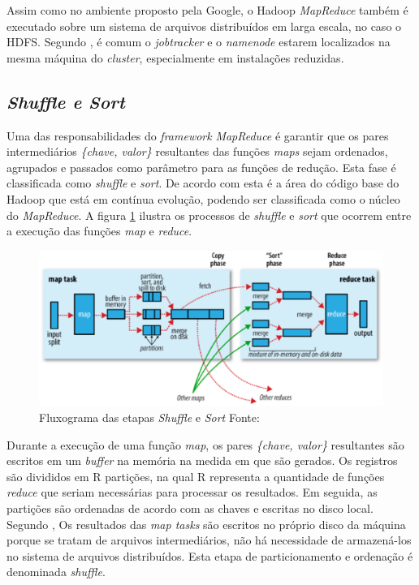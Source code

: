 Assim como no ambiente proposto pela Google, o Hadoop \textit{MapReduce} também é executado sobre um sistema de arquivos distribuídos em larga escala, no caso o HDFS. Segundo , é comum o \textit{jobtracker} e o \textit{namenode} estarem localizados na mesma máquina do \textit{cluster}, especialmente em instalações reduzidas.

\subsection{\textit{Shuffle e Sort}}

Uma das responsabilidades do \textit{framework} \textit{MapReduce} é garantir que os pares intermediários \textit{\{chave, valor\}} resultantes das funções \textit{maps} sejam ordenados, agrupados e passados como parâmetro para as funções de redução. Esta fase é classificada como \textit{shuffle} e \textit{sort}. De acordo com  esta é a área do código base do Hadoop que está em contínua evolução, podendo ser classificada como o núcleo do \textit{MapReduce}. A figura \ref{fig-shuffle} ilustra os processos de \textit{shuffle} e \textit{sort} que ocorrem entre a execução das funções \textit{map} e \textit{reduce}.

\begin{figure}[ht!]
	\centering
	\includegraphics[keepaspectratio=true,scale=0.6]
	  {figuras/shuffle.eps}
	\caption[Fluxograma das etapas \textit{Shuffle} e \textit{Sort}]{Fluxograma das etapas \textit{Shuffle} e \textit{Sort}
	\protect\linebreak Fonte: \cite{white2012}}
	\label{fig-shuffle}
\end{figure}
\FloatBarrier

Durante a execução de uma função \textit{map}, os pares \textit{\{chave, valor\}} resultantes são escritos em um \textit{buffer} na memória na medida em que são gerados. Os registros são divididos em R partições, na qual R representa a quantidade de funções \textit{reduce} que seriam necessárias para processar os resultados. Em seguida, as partições são ordenadas de acordo com as chaves e escritas no disco local. Segundo , Os resultados das \textit{map tasks} são escritos no próprio disco da máquina porque se tratam de arquivos intermediários, não há necessidade de armazená-los no sistema de arquivos distribuídos. Esta etapa de particionamento e ordenação é denominada \textit{shuffle}.

